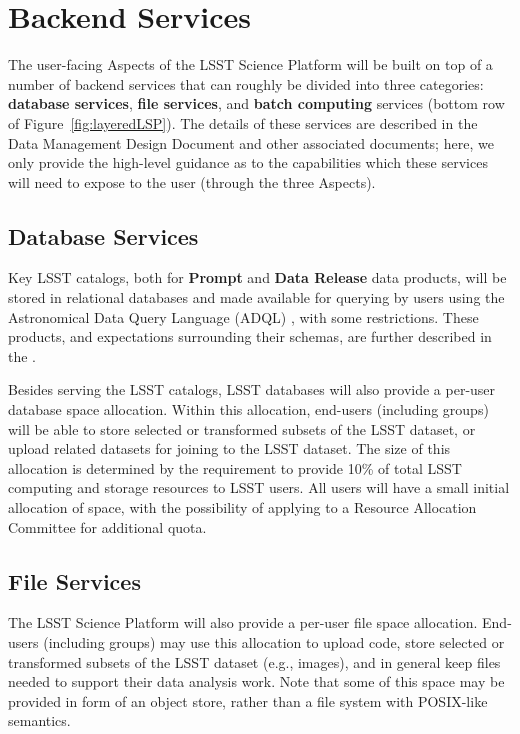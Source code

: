 \section{Backend Services\label{sec:backend}}

The user-facing Aspects of the LSST Science Platform will be built on top of a number of backend services that can roughly be divided into three categories: \textbf{database services}, \textbf{file services}, and \textbf{batch computing} services (bottom row of Figure~\ref{fig:layeredLSP}).
The details of these services are described in the Data Management Design Document  and other associated documents; here, we only provide the high-level guidance as to the capabilities which these services will need to expose to the user (through the three Aspects).

\subsection{Database Services}

Key LSST catalogs, both for \textbf{Prompt} and \textbf{Data Release} data products, will be stored in relational databases and made available for querying by users using
the Astronomical Data Query Language (ADQL) \citep{2023ivoa.spec.1215M}, with some restrictions.
These products, and expectations surrounding their schemas, are further described in the \DPDD.

Besides serving the LSST catalogs, LSST databases will also provide a per-user database space allocation.
Within this allocation, end-users (including groups) will be able to store selected or transformed subsets of the LSST dataset, or upload related datasets for joining to the LSST dataset.
The size of this allocation is determined by the \SRD requirement to provide 10\% of total LSST computing and storage resources to LSST users.
All users will have a small initial allocation of space, with the possibility of applying to a Resource Allocation Committee for additional quota.

\subsection{File Services}

The LSST Science Platform will also provide a per-user file space allocation.
End-users (including groups) may use this allocation to upload code, store selected or transformed subsets of the LSST dataset (e.g., images), and in general keep files needed to support their data analysis work.
Note that some of this space may be provided in form of an object store, rather than a file system with POSIX-like semantics.

